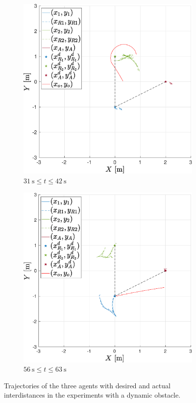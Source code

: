 \documentclass{ifacconf}
\begin{document}
\begin{figure}
\begin{subfigure}[b]{0.32\columnwidth}
        \includegraphics[width=\linewidth]{images/experiment/dynamic_obstacles/dynamicObst_exp_closeR2_bigger.eps}
         \caption{$\SI{31}{\second} \leq  t \leq \SI{42}{\second}$}
    \end{subfigure}
    \begin{subfigure}[b]{0.32\columnwidth}
        \centering
        \includegraphics[width=\linewidth]{images/experiment/dynamic_obstacles/dynamicObst_exp_closeR1_bigger.eps}
        \caption{$\SI{56}{\second} \leq  t \leq \SI{63}{\second}$}
    \end{subfigure}
    \vspace{-0.2cm}
    \caption{Trajectories of the three agents with desired and actual interdistances 
   in the experiments with a dynamic obstacle.}
\end{figure}
\end{document}
